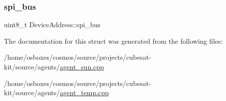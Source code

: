 \subsubsection{\texorpdfstring{spi\+\_\+bus}{spi\_bus}}
{\footnotesize\ttfamily uint8\+\_\+t Device\+Address\+::spi\+\_\+bus}



The documentation for this struct was generated from the following files\+:\begin{DoxyCompactItemize}
\item 
/home/osboxes/cosmos/source/projects/cubesat-\/kit/source/agents/\hyperlink{agent__sun_8cpp}{agent\+\_\+sun.\+cpp}\item 
/home/osboxes/cosmos/source/projects/cubesat-\/kit/source/agents/\hyperlink{agent__temp_8cpp}{agent\+\_\+temp.\+cpp}\end{DoxyCompactItemize}
